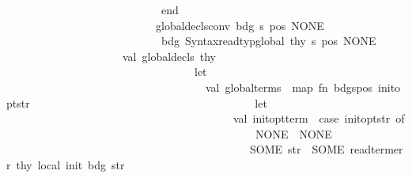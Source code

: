 \begin{isabellebody}
\ \ \ \ \ \ \ \ \ \ \ \ \ \ \ \ \ \ \ \ \ \ \ \ \ \ \ \ end\isanewline
\ \ \ \ \ \ \ \ \ \ \ \ \ \ \ \ \ \ \ \ \ \ \ \ \ \ {\isacharbar}{\kern0pt}\ global{\isacharunderscore}{\kern0pt}decls{\isacharunderscore}{\kern0pt}conv\ {\isacharparenleft}{\kern0pt}{\isacharparenleft}{\kern0pt}bdg{\isacharcomma}{\kern0pt}\ {\isacharparenleft}{\kern0pt}s{\isacharcomma}{\kern0pt}\ pos{\isacharparenright}{\kern0pt}{\isacharparenright}{\kern0pt}{\isacharcomma}{\kern0pt}\ NONE{\isacharparenright}{\kern0pt}\ {\isacharequal}{\kern0pt}\isanewline
\ \ \ \ \ \ \ \ \ \ \ \ \ \ \ \ \ \ \ \ \ \ \ \ \ \ \ \ {\isacharparenleft}{\kern0pt}bdg{\isacharcomma}{\kern0pt}\ Syntax{\isachardot}{\kern0pt}read{\isacharunderscore}{\kern0pt}typ{\isacharunderscore}{\kern0pt}global\ thy\ s{\isacharcomma}{\kern0pt}\ pos{\isacharcomma}{\kern0pt}\ NONE{\isacharparenright}{\kern0pt}\isanewline
\ \ \ \ \ \ \ \ \ \ \ \ \ \ \ \ \ \ \ \ \ val\ {\isacharparenleft}{\kern0pt}global{\isacharunderscore}{\kern0pt}decls{\isacharprime}{\kern0pt}{\isacharcomma}{\kern0pt}\ thy{}{\isacharprime}{\kern0pt}{\isacharparenright}{\kern0pt}\ {\isacharequal}{\kern0pt}\ \isanewline
\ \ \ \ \ \ \ \ \ \ \ \ \ \ \ \ \ \ \ \ \ \ \ \ \ \ \ \ \ \ \ \ \ \ let\isanewline
\ \ \ \ \ \ \ \ \ \ \ \ \ \ \ \ \ \ \ \ \ \ \ \ \ \ \ \ \ \ \ \ \ \ \ \ val\ global{\isacharunderscore}{\kern0pt}terms\ {\isacharequal}{\kern0pt}\ map\ {\isacharparenleft}{\kern0pt}fn\ {\isacharparenleft}{\kern0pt}{\isacharparenleft}{\kern0pt}bdg{\isacharcomma}{\kern0pt}{\isacharparenleft}{\kern0pt}s{\isacharcomma}{\kern0pt}pos{\isacharparenright}{\kern0pt}{\isacharparenright}{\kern0pt}{\isacharcomma}{\kern0pt}\ init{\isacharunderscore}{\kern0pt}opt{\isacharunderscore}{\kern0pt}str{\isacharparenright}{\kern0pt}\ {\isacharequal}{\kern0pt}{\isachargreater}{\kern0pt}\isanewline
\ \ \ \ \ \ \ \ \ \ \ \ \ \ \ \ \ \ \ \ \ \ \ \ \ \ \ \ \ \ \ \ \ \ \ \ \ \ \ let\isanewline
\ \ \ \ \ \ \ \ \ \ \ \ \ \ \ \ \ \ \ \ \ \ \ \ \ \ \ \ \ \ \ \ \ \ \ \ \ \ \ \ \ val\ init{\isacharunderscore}{\kern0pt}opt{\isacharunderscore}{\kern0pt}term\ {\isacharequal}{\kern0pt}\ case\ init{\isacharunderscore}{\kern0pt}opt{\isacharunderscore}{\kern0pt}str\ of\isanewline
\ \ \ \ \ \ \ \ \ \ \ \ \ \ \ \ \ \ \ \ \ \ \ \ \ \ \ \ \ \ \ \ \ \ \ \ \ \ \ \ \ \ \ \ \ NONE\ {\isacharequal}{\kern0pt}{\isachargreater}{\kern0pt}\ NONE\isanewline
\ \ \ \ \ \ \ \ \ \ \ \ \ \ \ \ \ \ \ \ \ \ \ \ \ \ \ \ \ \ \ \ \ \ \ \ \ \ \ \ \ \ \ {\isacharbar}{\kern0pt}\ SOME\ str\ {\isacharequal}{\kern0pt}{\isachargreater}{\kern0pt}\ SOME\ {\isacharparenleft}{\kern0pt}read{\isacharunderscore}{\kern0pt}term{\isacharunderscore}{\kern0pt}err\ thy\ {\isachardoublequote}{\kern0pt}local\ init{\isachardoublequote}{\kern0pt}\ bdg\ str{\isacharparenright}{\kern0pt}\isanewline

\end{isabellebody}
